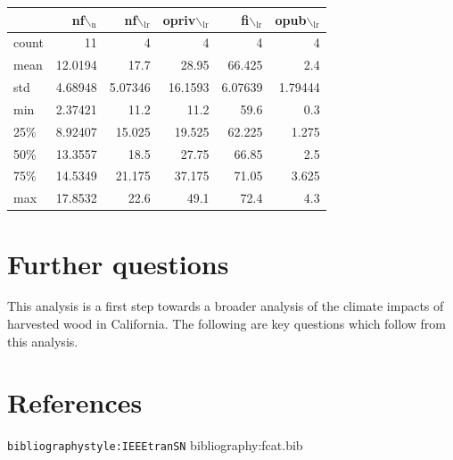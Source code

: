 \documentclass[a4paper]{article}
\begin{document}
\begin{enumerate}
\begin{center}
\begin{tabular}{lrrrrr}
 & nf$\backslash$$_{\text{n}}$ & nf$\backslash$$_{\text{lr}}$ & opriv$\backslash$$_{\text{lr}}$ & fi$\backslash$$_{\text{lr}}$ & opub$\backslash$$_{\text{lr}}$\\
\hline
count & 11 & 4 & 4 & 4 & 4\\
mean & 12.0194 & 17.7 & 28.95 & 66.425 & 2.4\\
std & 4.68948 & 5.07346 & 16.1593 & 6.07639 & 1.79444\\
min & 2.37421 & 11.2 & 11.2 & 59.6 & 0.3\\
25\% & 8.92407 & 15.025 & 19.525 & 62.225 & 1.275\\
50\% & 13.3557 & 18.5 & 27.75 & 66.85 & 2.5\\
75\% & 14.5349 & 21.175 & 37.175 & 71.05 & 3.625\\
max & 17.8532 & 22.6 & 49.1 & 72.4 & 4.3\\
\end{tabular}
\end{center}
\end{enumerate}



\section{Further questions}
\label{sec-4}

This analysis is a first step towards a broader analysis of the
climate impacts of harvested wood in California. The following are key
questions which follow from this analysis.

\section{References}
\label{sec-5}
\texttt{bibliographystyle:IEEEtranSN}
bibliography:fcat.bib
\end{document}
